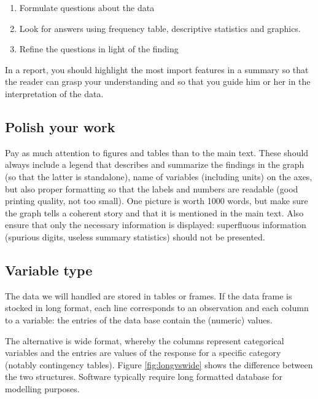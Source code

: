 \documentclass[
  11pt,
  letterpaper,
]{book}
\providecommand{\tightlist}{%
  \setlength{\itemsep}{0pt}\setlength{\parskip}{0pt}}
\theoremstyle{definition}
\theoremstyle{definition}
\theoremstyle{definition}
\theoremstyle{remark}
\begin{document}
\begin{enumerate}
\def\labelenumi{\arabic{enumi}.}
\tightlist
\item
  Formulate questions about the data
\item
  Look for answers using frequency table, descriptive statistics and graphics.
\item
  Refine the questions in light of the finding
\end{enumerate}

In a report, you should highlight the most import features in a summary so that the reader can grasp your understanding and so that you guide him or her in the interpretation of the data.

\hypertarget{polish-your-work}{%
\subsection{Polish your work}\label{polish-your-work}}

Pay as much attention to figures and tables than to the main text. These should always include a legend that describes and summarize the findings in the graph (so that the latter is standalone), name of variables (including units) on the axes, but also proper formatting so that the labels and numbers are readable (good printing quality, not too small). One picture is worth 1000 words, but make sure the graph tells a coherent story and that it is mentioned in the main text. Also ensure that only the necessary information is displayed: superfluous information (spurious digits, useless summary statistics) should not be presented.

\hypertarget{variable-type}{%
\subsection{Variable type}\label{variable-type}}

The data we will handled are stored in tables or frames. If the data frame is stocked in long format, each line corresponds to an observation and each column to a variable: the entries of the data base contain the (numeric) values.

The alternative is wide format, whereby the columns represent categorical variables and the entries are values of the response for a specific category (notably contingency tables). Figure \ref{fig:longvswide} shows the difference between the two structures. Software typically require long formatted database for modelling purposes.
\end{document}
